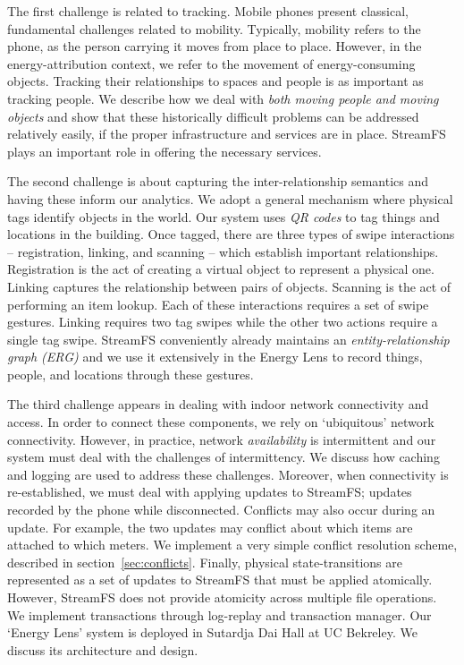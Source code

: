 The first challenge is related to tracking.  Mobile phones present classical, fundamental challenges related to mobility.  Typically, mobility
refers to the phone, as the person carrying it moves from place to place.  However, in the energy-attribution
context, we refer to the movement of energy-consuming objects.  Tracking their relationships to spaces 
and people is as important as tracking people.  We describe how we deal with \emph{both moving people and 
moving objects} and show that these historically difficult problems can be addressed relatively easily, if the proper infrastructure 
and services are in place.  StreamFS plays an important role in offering the necessary services.

The second challenge is about capturing the inter-relationship semantics and having these inform our analytics.
We adopt a general mechanism where physical tags identify objects in the world.  Our system uses \emph{QR codes} to tag things and locations 
in the building.  
Once tagged, there are three types of swipe interactions -- 
registration, linking, and scanning -- which establish important relationships.  Registration is the act of creating a virtual object 
to represent a physical one.  Linking captures the relationship between pairs of objects.  Scanning is the act of performing an item lookup.
Each of these interactions requires a set of swipe gestures.  Linking requires two tag swipes while the other two actions
require a single tag swipe.  StreamFS conveniently already maintains an \emph{entity-relationship graph (ERG)} and we use it 
extensively in the Energy Lens to record things, people, and locations through these gestures.

The third challenge appears in dealing with indoor network connectivity and access.
In order to connect these components, we rely on `ubiquitous' network connectivity.  However, in practice, network
\emph{availability} is intermittent and our system must deal with the challenges of intermittency.  We discuss how caching
and logging are used to address these challenges.  Moreover, when connectivity is re-established, we must deal with
applying updates to StreamFS; updates recorded by the phone while disconnected.  
Conflicts may also occur during an update.  For example, the two updates may conflict about which items are attached
to which meters.  We implement a very simple conflict resolution scheme, described in section~\ref{sec:conflicts}.
Finally, physical state-transitions are represented as a set of updates to StreamFS that must be applied 
atomically.  However, StreamFS does not provide atomicity across multiple file operations.  We implement transactions through 
log-replay and transaction manager.  Our `Energy Lens' system is deployed in Sutardja Dai Hall at UC Bekreley.  We discuss
its architecture and design.  
  
